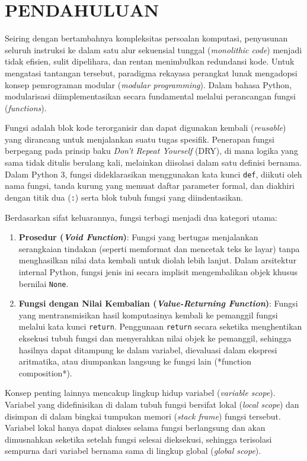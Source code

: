 \documentclass[12pt,a4paper]{article}
\begin{document}
\section{PENDAHULUAN}
Seiring dengan bertambahnya kompleksitas persoalan komputasi, penyusunan seluruh instruksi ke dalam satu alur sekuensial tunggal (\textit{monolithic code}) menjadi tidak efisien, sulit dipelihara, dan rentan menimbulkan redundansi kode. Untuk mengatasi tantangan tersebut, paradigma rekayasa perangkat lunak mengadopsi konsep pemrograman modular (\textit{modular programming}). Dalam bahasa Python, modularisasi diimplementasikan secara fundamental melalui perancangan fungsi (\textit{functions}).

Fungsi adalah blok kode terorganisir dan dapat digunakan kembali (\textit{reusable}) yang dirancang untuk menjalankan suatu tugas spesifik. Penerapan fungsi berpegang pada prinsip baku \textit{Don't Repeat Yourself} (DRY), di mana logika yang sama tidak ditulis berulang kali, melainkan diisolasi dalam satu definisi bernama. Dalam Python 3, fungsi dideklarasikan menggunakan kata kunci \texttt{def}, diikuti oleh nama fungsi, tanda kurung yang memuat daftar parameter formal, dan diakhiri dengan titik dua (\texttt{:}) serta blok tubuh fungsi yang diindentasikan.

Berdasarkan sifat keluarannya, fungsi terbagi menjadi dua kategori utama:
\begin{enumerate}
    \item \textbf{Prosedur (\textit{Void Function})}: Fungsi yang bertugas menjalankan serangkaian tindakan (seperti memformat dan mencetak teks ke layar) tanpa menghasilkan nilai data kembali untuk diolah lebih lanjut. Dalam arsitektur internal Python, fungsi jenis ini secara implisit mengembalikan objek khusus bernilai \texttt{None}.
    \item \textbf{Fungsi dengan Nilai Kembalian (\textit{Value-Returning Function})}: Fungsi yang mentransmisikan hasil komputasinya kembali ke pemanggil fungsi melalui kata kunci \texttt{return}. Penggunaan \texttt{return} secara seketika menghentikan eksekusi tubuh fungsi dan menyerahkan nilai objek ke pemanggil, sehingga hasilnya dapat ditampung ke dalam variabel, dievaluasi dalam ekspresi aritmatika, atau diumpankan langsung ke fungsi lain (*function composition*).
\end{enumerate}

Konsep penting lainnya mencakup lingkup hidup variabel (\textit{variable scope}). Variabel yang didefinisikan di dalam tubuh fungsi bersifat lokal (\textit{local scope}) dan disimpan di dalam bingkai tumpukan memori (\textit{stack frame}) fungsi tersebut. Variabel lokal hanya dapat diakses selama fungsi berlangsung dan akan dimusnahkan seketika setelah fungsi selesai dieksekusi, sehingga terisolasi sempurna dari variabel bernama sama di lingkup global (\textit{global scope}).
\end{document}
